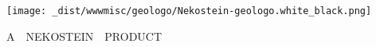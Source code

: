 \documentclass[10pt]{article}
\begin{document}
\pagecolor{black}
\color{white}
\leavevmode
{}\paperheight
\center

\texttt{[image: \_dist/wwwmisc/geologo/Nekostein-geologo.white\_black.png]}
\vskip 80pt

\fontsize{21pt}{21pt}\selectfont
A~~NEKOSTEIN~~PRODUCT
\end{document}
